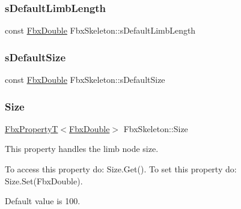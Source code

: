 \mbox{\label{class_fbx_skeleton_a61aa3623c65047b3e7e66a173711b1ef}} 
\subsubsection{\texorpdfstring{s\+Default\+Limb\+Length}{sDefaultLimbLength}}
{\footnotesize\ttfamily const \hyperlink{fbxtypes_8h_a171e72a1c46fc15c1a6c9c31948c1c5b}{Fbx\+Double} Fbx\+Skeleton\+::s\+Default\+Limb\+Length\hspace{0.3cm}{\ttfamily [static]}}

\mbox{\label{class_fbx_skeleton_aabac60f53d2b665f37ac74e7ac9a402a}} 
\subsubsection{\texorpdfstring{s\+Default\+Size}{sDefaultSize}}
{\footnotesize\ttfamily const \hyperlink{fbxtypes_8h_a171e72a1c46fc15c1a6c9c31948c1c5b}{Fbx\+Double} Fbx\+Skeleton\+::s\+Default\+Size\hspace{0.3cm}{\ttfamily [static]}}

\mbox{\label{class_fbx_skeleton_aecaa95bc659ea1804ec5885d9116c1c6}} 
\subsubsection{\texorpdfstring{Size}{Size}}
{\footnotesize\ttfamily \hyperlink{class_fbx_property_t}{Fbx\+PropertyT}$<$\hyperlink{fbxtypes_8h_a171e72a1c46fc15c1a6c9c31948c1c5b}{Fbx\+Double}$>$ Fbx\+Skeleton\+::\+Size}

This property handles the limb node size.

To access this property do\+: Size.\+Get(). To set this property do\+: Size.\+Set(\+Fbx\+Double).

Default value is 100. \mbox{\label{class_fbx_skeleton_ac243ade080949dfcaa564d95e2f4aa6b}} 
